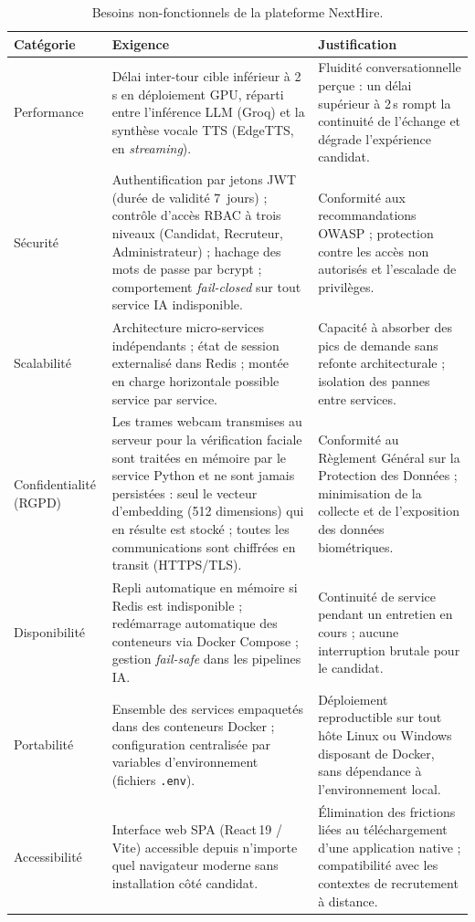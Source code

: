 \begin{table}[H]
  \centering
  \footnotesize
  \renewcommand{\arraystretch}{1.45}
  \begin{tabularx}{\textwidth}{|>{\raggedright\arraybackslash}p{2.4cm}|>{\raggedright\arraybackslash}X|>{\raggedright\arraybackslash}X|}
    \hline
    \textbf{Catégorie} & \textbf{Exigence} & \textbf{Justification} \\
    \hline
    Performance & Délai inter-tour cible inférieur à 2\,s en déploiement GPU, réparti entre l'inférence LLM (Groq) et la synthèse vocale TTS (EdgeTTS, en \textit{streaming}). &
    Fluidité conversationnelle perçue : un délai supérieur à 2\,s rompt la continuité de l'échange et dégrade l'expérience candidat. \\
    \hline
    Sécurité & Authentification par jetons JWT (durée de validité 7~jours) ; contrôle d'accès RBAC à trois niveaux (Candidat, Recruteur, Administrateur) ; hachage des mots de passe par bcrypt ; comportement \textit{fail-closed} sur tout service IA indisponible. &
    Conformité aux recommandations OWASP ; protection contre les accès non autorisés et l'escalade de privilèges. \\
    \hline
    Scalabilité & Architecture micro-services indépendants ; état de session externalisé dans Redis ; montée en charge horizontale possible service par service. &
    Capacité à absorber des pics de demande sans refonte architecturale ; isolation des pannes entre services. \\
    \hline
    Confidentialité (RGPD) & Les trames webcam transmises au serveur pour la vérification faciale sont traitées en mémoire par le service Python et ne sont jamais persistées : seul le vecteur d'embedding (512 dimensions) qui en résulte est stocké ; toutes les communications sont chiffrées en transit (HTTPS/TLS). &
    Conformité au Règlement Général sur la Protection des Données ; minimisation de la collecte et de l'exposition des données biométriques. \\
    \hline
    Disponibilité & Repli automatique en mémoire si Redis est indisponible ; redémarrage automatique des conteneurs via Docker Compose ; gestion \textit{fail-safe} dans les pipelines IA. &
    Continuité de service pendant un entretien en cours ; aucune interruption brutale pour le candidat. \\
    \hline
    Portabilité & Ensemble des services empaquetés dans des conteneurs Docker ; configuration centralisée par variables d'environnement (fichiers \texttt{.env}). &
    Déploiement reproductible sur tout hôte Linux ou Windows disposant de Docker, sans dépendance à l'environnement local. \\
    \hline
    Accessibilité & Interface web SPA (React\,19 / Vite) accessible depuis n'importe quel navigateur moderne sans installation côté candidat. &
    Élimination des frictions liées au téléchargement d'une application native ; compatibilité avec les contextes de recrutement à distance. \\
    \hline
  \end{tabularx}
  \caption{Besoins non-fonctionnels de la plateforme NextHire.}
  \label{tab:bnf}
\end{table}


